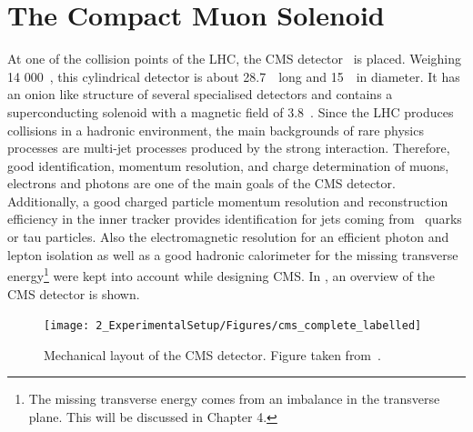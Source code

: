 \section{The Compact Muon Solenoid}
\label{sec:CMS}
At one of the collision points of the LHC, the CMS detector~\cite{CMS, Bayatian:2006zz,Bayatian:922757} is placed. Weighing 14 000~\tonne, this cylindrical detector is about 28.7~\meter\ long and 15~\meter\ in diameter. It has an onion like structure of several specialised detectors and contains a superconducting solenoid with a magnetic field of 3.8~\Tesla. Since the LHC produces collisions in a hadronic environment,  the main backgrounds of rare physics processes are  multi-jet processes produced by the strong interaction. Therefore, good identification, momentum resolution, and charge determination of muons, electrons and photons are one of the main goals of the CMS detector. Additionally, a good charged particle momentum resolution and reconstruction efficiency in the inner tracker provides identification for jets coming from \Pbottom\ quarks or tau particles. Also the electromagnetic resolution for an efficient photon and lepton isolation as well as a good hadronic calorimeter for the missing transverse energy\footnote{The missing transverse energy comes from an imbalance in the transverse plane. This will be discussed in Chapter 4.} were kept into account while designing CMS. In , an overview of the CMS detector is shown. 
\begin{figure}[htbp]
	\centering
	\texttt{[image: 2\_ExperimentalSetup/Figures/cms\_complete\_labelled]}
	\caption{Mechanical layout of the CMS detector. Figure taken from~\cite{CMSdraw}.}
	\label{fig:CMS}
\end{figure}

\newpage
